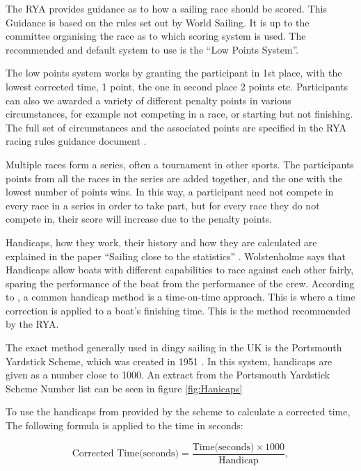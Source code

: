 \documentclass{l4proj}
\begin{document}
The RYA provides guidance as to how a sailing race should be scored. This Guidance is based on the rules set out by World Sailing. It is up to the committee organising the race as to which scoring system is used. The recommended and default system to use is the “Low Points System”.

The low points system works by granting the participant in 1st place, with the lowest corrected time, 1 point, the one in second place 2 points etc. Participants can also we awarded a variety of different penalty points in various circumstances, for example not competing in a race, or starting but not finishing. The full set of circumstances and the associated points are specified in the RYA racing rules guidance document \citet{RYAscore}.

Multiple races form a series, often a tournament in other sports. The participants points from all the races in the series are added together, and the one with the lowest number of points wins. In this way, a participant need not compete in every race in a series in order to take part, but for every race they do not compete in, their score will increase due to the penalty points.

Handicaps, how they work, their history and how they are calculated are explained in the paper “Sailing close to the statistics” \citep{hanicaps}. Wolstenholme says that Handicaps allow boats with different capabilities to race against each other fairly, sparing the performance of the boat from the performance of the crew. 
According to \citet{hanicaps}, a common handicap method is a time-on-time approach. This is where a time correction is applied to a boat’s finishing time. This is the method recommended by the RYA.

The exact method generally used in dingy sailing in the UK is the Portsmouth Yardstick Scheme, which was created in 1951 \citep{hanicaps}. In this system, handicaps are given as a number close to 1000. An extract from the Portsmouth Yardstick Scheme Number list \citep{RYApy} can be seen in figure \ref{fig:Hanicaps}

To use the handicaps from provided by the scheme to calculate a corrected time, The following formula is applied to the time in seconds:

\begin{equation}
    \text{Corrected Time(seconds)} = \frac{\text{Time(seconds)} \times 1000}{\text{Handicap}},
    \label{eq:1}
\end{equation}  
\end{document}
